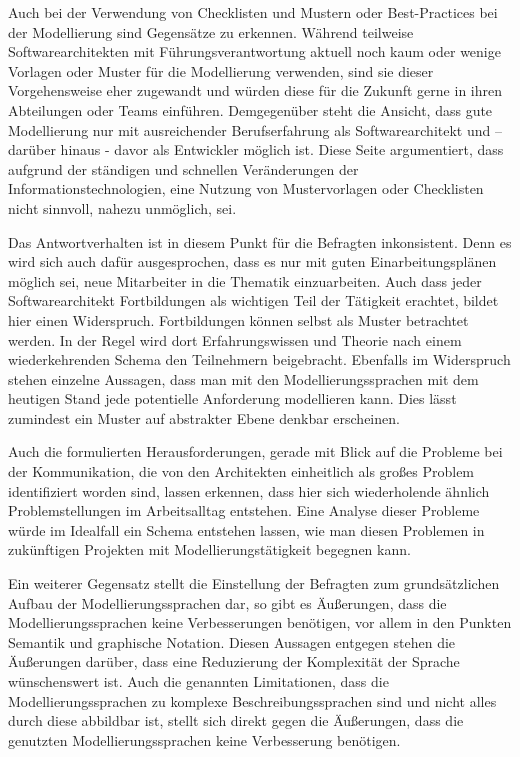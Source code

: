 Auch bei der Verwendung von Checklisten und Mustern oder Best-Practices bei der Modellierung sind Gegensätze zu erkennen. Während teilweise Softwarearchitekten mit Führungsverantwortung aktuell noch kaum oder wenige Vorlagen oder Muster für die Modellierung verwenden, sind sie dieser Vorgehensweise eher zugewandt und würden diese für die Zukunft gerne in ihren Abteilungen oder Teams einführen. Demgegenüber steht die Ansicht, dass gute Modellierung nur mit ausreichender Berufserfahrung als Softwarearchitekt und – darüber hinaus - davor als Entwickler möglich ist. Diese Seite argumentiert, dass aufgrund der ständigen und schnellen Veränderungen der Informationstechnologien, eine Nutzung von Mustervorlagen oder Checklisten nicht sinnvoll, nahezu unmöglich, sei.

Das Antwortverhalten ist in diesem Punkt für die Befragten inkonsistent. Denn es wird sich auch dafür ausgesprochen, dass es nur mit guten Einarbeitungsplänen möglich sei, neue Mitarbeiter in die Thematik einzuarbeiten. Auch dass jeder Softwarearchitekt Fortbildungen als wichtigen Teil der Tätigkeit erachtet, bildet hier einen Widerspruch. Fortbildungen können selbst als Muster betrachtet werden. In der Regel wird dort Erfahrungswissen und Theorie nach einem wiederkehrenden Schema den Teilnehmern beigebracht. Ebenfalls im Widerspruch stehen einzelne Aussagen, dass man mit den Modellierungssprachen mit dem heutigen Stand jede potentielle Anforderung modellieren kann. Dies lässt zumindest ein Muster auf abstrakter Ebene denkbar erscheinen.

Auch die formulierten Herausforderungen, gerade mit Blick auf die Probleme bei der Kommunikation, die von den Architekten einheitlich als großes Problem identifiziert worden sind, lassen erkennen, dass hier sich wiederholende ähnlich Problemstellungen im Arbeitsalltag entstehen. Eine Analyse dieser Probleme würde im Idealfall ein Schema entstehen lassen, wie man diesen Problemen in zukünftigen Projekten mit Modellierungstätigkeit begegnen kann.

Ein weiterer Gegensatz stellt die Einstellung der Befragten zum grundsätzlichen Aufbau der Modellierungssprachen dar, so gibt es Äußerungen, dass die Modellierungssprachen keine Verbesserungen benötigen, vor allem in den Punkten Semantik und graphische Notation. Diesen Aussagen entgegen stehen die Äußerungen darüber, dass eine Reduzierung der Komplexität der Sprache wünschenswert ist. Auch die genannten Limitationen, dass die Modellierungssprachen zu komplexe Beschreibungssprachen sind und nicht alles durch diese abbildbar ist, stellt sich direkt gegen die Äußerungen, dass die genutzten Modellierungssprachen keine Verbesserung benötigen. 

